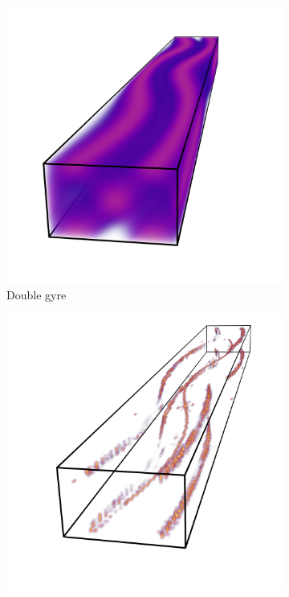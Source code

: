 \begin{figure}
    \begin{subfigure}{0.33\textwidth}
        \includegraphics[trim=200 0 200 0, clip=true, width=\textwidth]{Images/dgyre.png}
        \caption{Double gyre}
        \label{fig:dgfield}
    \end{subfigure}
    \begin{subfigure}{0.33\textwidth}
        \includegraphics[trim=200 0 200 0, clip=true, width=\textwidth]{Images/RL3D.png}

\end{subfigure}
\end{figure}
